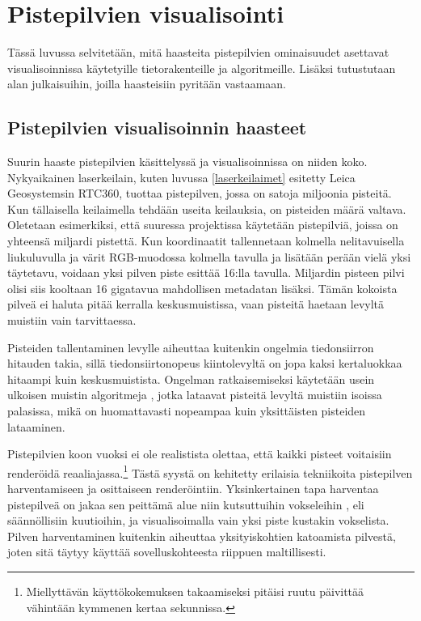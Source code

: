 \section{Pistepilvien visualisointi}\label{kirjallisuus}

Tässä luvussa selvitetään, mitä haasteita pistepilvien ominaisuudet asettavat visualisoinnissa käytetyille tietorakenteille ja algoritmeille. Lisäksi tutustutaan alan julkaisuihin, joilla haasteisiin pyritään vastaamaan.

\subsection{Pistepilvien visualisoinnin haasteet}

Suurin haaste pistepilvien käsittelyssä ja visualisoinnissa on niiden koko. Nykyaikainen laserkeilain, kuten luvussa \ref{laserkeilaimet} esitetty Leica Geosystemsin RTC360, tuottaa pistepilven, jossa on satoja miljoonia pisteitä. Kun tällaisella keilaimella tehdään useita keilauksia, on pisteiden määrä valtava. Oletetaan esimerkiksi, että suuressa projektissa käytetään pistepilviä, joissa on yhteensä miljardi pistettä. Kun koordinaatit tallennetaan kolmella nelitavuisella liukuluvulla ja värit RGB-muodossa kolmella tavulla ja lisätään perään vielä yksi täytetavu, voidaan yksi pilven piste esittää 16:lla tavulla. Miljardin pisteen pilvi olisi siis kooltaan 16 gigatavua mahdollisen metadatan lisäksi. Tämän kokoista pilveä ei haluta pitää kerralla keskusmuistissa, vaan pisteitä haetaan levyltä muistiin vain tarvittaessa. 

Pisteiden tallentaminen levylle aiheuttaa kuitenkin ongelmia tiedonsiirron hitauden takia, sillä tiedonsiirtonopeus kiintolevyltä on jopa kaksi kertaluokkaa hitaampi kuin keskusmuistista. Ongelman ratkaisemiseksi käytetään usein ulkoisen muistin algoritmeja , jotka lataavat pisteitä levyltä muistiin isoissa palasissa, mikä on huomattavasti nopeampaa kuin yksittäisten pisteiden lataaminen. \cite{scheiblauer} 

Pistepilvien koon vuoksi ei ole realistista olettaa, että kaikki pisteet voitaisiin renderöidä reaaliajassa.\footnote{Miellyttävän käyttökokemuksen takaamiseksi pitäisi ruutu päivittää vähintään kymmenen kertaa sekunnissa.} Tästä syystä on kehitetty erilaisia tekniikoita pistepilven harventamiseen ja osittaiseen renderöintiin. Yksinkertainen tapa harventaa pistepilveä on jakaa sen peittämä alue niin kutsuttuihin vokseleihin , eli säännöllisiin kuutioihin, ja visualisoimalla vain yksi piste kustakin vokselista. Pilven harventaminen kuitenkin aiheuttaa yksityiskohtien katoamista pilvestä, joten sitä täytyy käyttää sovelluskohteesta riippuen maltillisesti. 

